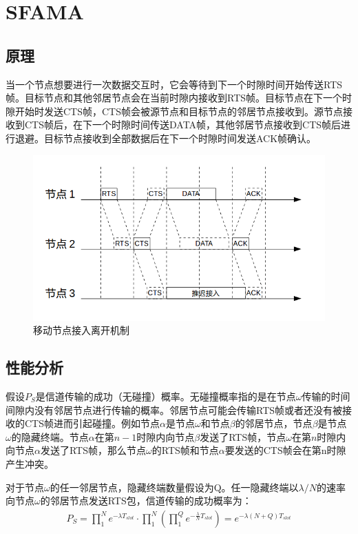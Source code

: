 \section{SFAMA}

\subsection{原理}
当一个节点想要进行一次数据交互时，它会等待到下一个时隙时间开始传送RTS帧。目标节点和其他邻居节点会在当前时隙内接收到RTS帧。目标节点在下一个时隙开始时发送CTS帧，CTS帧会被源节点和目标节点的邻居节点接收到。源节点接收到CTS帧后，在下一个时隙时间传送DATA帧，其他邻居节点接收到CTS帧后进行退避。目标节点接收到全部数据后在下一个时隙时间发送ACK帧确认。

\begin{figure}[ht]
	\centering
	\includegraphics[scale=0.4]{figures/sf.png}
	\caption{
		移动节点接入离开机制
	}
	\label{fig:example}
\end{figure}

\subsection{性能分析}
假设$P_S$是信道传输的成功（无碰撞）概率。无碰撞概率指的是在节点$\omega$传输的时间间隙内没有邻居节点进行传输的概率。邻居节点可能会传输RTS帧或者还没有被接收的CTS帧进而引起碰撞。例如节点$\alpha$是节点$\omega$和节点$\beta$的邻居节点，节点$\beta$是节点$\omega$的隐藏终端。节点$\alpha$在第$n-1$时隙内向节点$\beta$发送了RTS帧，节点$\omega$在第$n$时隙内向节点$\alpha$发送了RTS帧，那么节点$\omega$的RTS帧和节点$\alpha$要发送的CTS帧会在第n时隙产生冲突。

对于节点$\omega$的任一邻居节点，隐藏终端数量假设为Q。任一隐藏终端以$\lambda/N$的速率向节点$\omega$的邻居节点发送RTS包，信道传输的成功概率为：
\begin{equation}
\begin{aligned}
P_S=\prod^N_1 e^{-\lambda T_{slot}}\cdot \prod^N_1 (\prod^Q_1 e^{-\frac{\lambda}{N} T_{slot}})= e^{-\lambda (N+Q) T_{slot}}
\end{aligned}
\end{equation}

